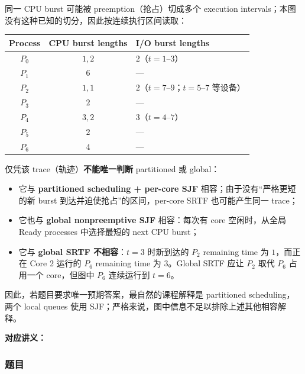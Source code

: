 \begin{checkedsolution}
同一 CPU burst 可能被 preemption（抢占）切成多个 execution intervals；本图没有这种已知的切分，因此按连续执行区间读取：

\begin{center}
\small
\begin{tabular}{@{}ccl@{}}
  \toprule
  Process & CPU burst lengths & I/O burst lengths \\
  \midrule
  $P_0$ & $1,2$ & $2$（$t=1$--$3$） \\
  $P_1$ & $6$   & --- \\
  $P_2$ & $1,1$ & $2$（$t=7$--$9$；$t=5$--$7$ 等设备） \\
  $P_3$ & $2$   & --- \\
  $P_4$ & $3,2$ & $3$（$t=4$--$7$） \\
  $P_5$ & $2$   & --- \\
  $P_6$ & $4$   & --- \\
  \bottomrule
\end{tabular}
\end{center}

仅凭该 trace（轨迹）\textbf{不能唯一判断} partitioned 或 global：

\begin{itemize}
  \item 它与 \textbf{partitioned scheduling + per-core SJF} 相容；由于没有“严格更短的新 burst 到达并迫使抢占”的区间，per-core SRTF 也可能产生同一 trace；
  \item 它也与 \textbf{global nonpreemptive SJF} 相容：每次有 core 空闲时，从全局 Ready processes 中选择最短的 next CPU burst；
  \item 它与 \textbf{global SRTF 不相容}：$t=3$ 时新到达的 $P_2$ remaining time 为 $1$，而正在 Core 2 运行的 $P_6$ remaining time 为 $3$。Global SRTF 应让 $P_2$ 取代 $P_6$ 占用一个 core，但图中 $P_6$ 连续运行到 $t=6$。
\end{itemize}

因此，若题目要求唯一预期答案，最自然的课程解释是 partitioned scheduling，两个 local queues 使用 SJF；严格来说，图中信息不足以排除上述其他相容解释。
\end{checkedsolution}

\clearpage
{}

\textbf{对应讲义：}

\subsubsection*{题目}

